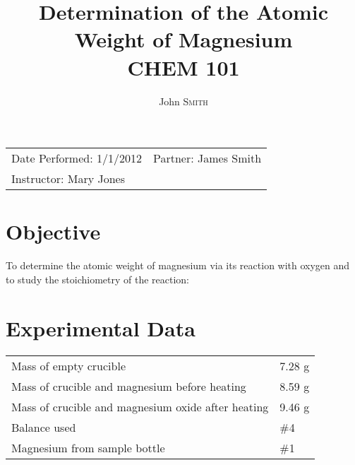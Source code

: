 \documentclass{article}
\title{Determination of the Atomic \\ Weight of Magnesium \\ CHEM 101} %
\author{John \textsc{Smith}} %
\begin{document}
\maketitle %

\begin{tabular}{lr}
Date Performed: 1/1/2012 & Partner: James Smith\\ %
Instructor: Mary Jones %
\end{tabular}

\setlength\parindent{0pt} %

\renewcommand{\labelenumi}{\alph{enumi}.} %


\section{Objective}

To determine the atomic weight of magnesium via its reaction with oxygen and to study the stoichiometry of the reaction:\\


 

\section{Experimental Data}

\begin{tabular}{ll}
Mass of empty crucible & 7.28 g\\
Mass of crucible and magnesium before heating & 8.59 g\\
Mass of crucible and magnesium oxide after heating & 9.46 g\\
Balance used & \#4\\
Magnesium from sample bottle & \#1
\end{tabular}
\end{document}
